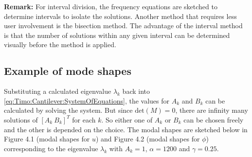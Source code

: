 \documentclass[../../main.tex]{subfiles}
\begin{document}
\textbf{Remark:} For interval division, the frequency equations are sketched to determine intervals to isolate the solutions. Another method that requires less user involvement is the bisection method. The advantage of the interval method is that the number of solutions within any given interval can be determined visually before the method is applied.

\subsection{Example of mode shapes}
Substituting a calculated eigenvalue $\lambda_k$ back into \eqref{eq:Timo:Cantilever:SystemOfEquations}, the values for $A_k$ and $B_k$ can be calculated by solving the system. But since $\textrm{det}(M) =0$, there are infinity many solutions of $[A_k \ B_k]^T$ for each $k$. So either one of $A_k$ or $B_k$ can be chosen freely and the other is depended on the choice. The modal shapes are sketched below in Figure 4.1 (modal shapes for $u$) and Figure 4.2 (modal shapes for $\phi$) corresponding to the eigenvalue $\lambda_k$ with $A_k = 1$, $\alpha = 1200$ and $\gamma = 0.25$.
\FloatBarrier
\end{document}
